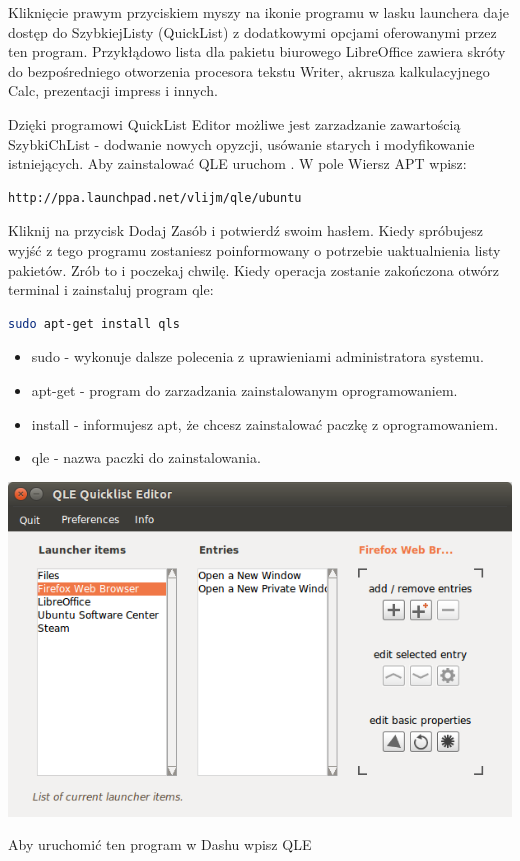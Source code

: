 Kliknięcie prawym przyciskiem myszy na ikonie programu w lasku launchera daje dostęp do SzybkiejListy (QuickList) z dodatkowymi opcjami oferowanymi przez ten program. Przykłądowo lista dla pakietu biurowego LibreOffice zawiera skróty do bezpośredniego otworzenia procesora tekstu Writer, akrusza kalkulacyjnego Calc, prezentacji impress i innych.

Dzięki programowi QuickList Editor możliwe jest zarzadzanie zawartością SzybkiChList - dodwanie nowych opyzcji, usówanie starych i modyfikowanie istniejących. Aby zainstalować QLE uruchom . W pole \textcolor{ubuntu_orange}{Wiersz APT} wpisz:
\begin{lstlisting}
http://ppa.launchpad.net/vlijm/qle/ubuntu
\end{lstlisting}
Kliknij na przycisk \textcolor{ubuntu_orange}{Dodaj Zasób} i potwierdź swoim hasłem. Kiedy spróbujesz wyjść z tego programu zostaniesz poinformowany o potrzebie uaktualnienia listy pakietów. Zrób to i poczekaj chwilę. Kiedy operacja zostanie zakończona otwórz terminal i zainstaluj program qle:
\begin{lstlisting}[language=bash]
sudo apt-get install qls
\end{lstlisting}
\begin{itemize}
\item \textcolor{ubuntu_orange}{sudo} - wykonuje dalsze polecenia z uprawieniami administratora systemu.
\item \textcolor{ubuntu_orange}{apt-get} - program do zarzadzania zainstalowanym oprogramowaniem.
\item \textcolor{ubuntu_orange}{install} - informujesz apt, że chcesz zainstalować paczkę z oprogramowaniem.
\item \textcolor{ubuntu_orange}{qle} - nazwa paczki do zainstalowania.
\end{itemize}
\begin{center}
	\includegraphics[width=\linewidth]{images/programy_qle.png}
\end{center}

Aby uruchomić ten program w Dashu wpisz \textcolor{ubuntu_orange}{QLE}

